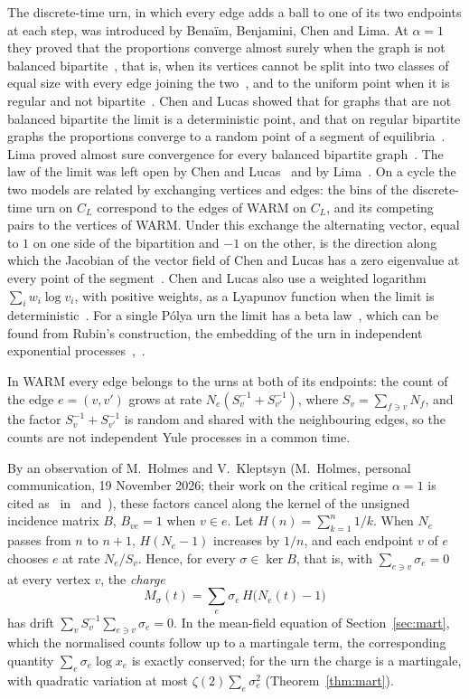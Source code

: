 \documentclass[11pt]{amsart}
\theoremstyle{remark}\newtheorem{remark}[theorem]{Remark}
\begin{document}
The discrete-time urn, in which every edge adds a ball to one of its two endpoints at each step, was introduced by
Bena\"im, Benjamini, Chen and Lima. At $\alpha=1$ they proved that the proportions converge almost surely when the
graph is not balanced bipartite~\cite[Corollary~1.3]{BBCL}, that is, when its vertices cannot be split into two
classes of equal size with every edge joining the two~\cite[Section~1]{BBCL}, and to the uniform point when it is regular and not
bipartite~\cite[Theorem~1.1]{BBCL}. Chen and Lucas showed that for graphs that are not balanced bipartite the limit is a
deterministic point, and that on regular bipartite graphs the proportions converge to a random point of a segment of
equilibria~\cite{CL}. Lima proved almost sure convergence for every balanced bipartite graph~\cite{Lima}. The law of
the limit was left open by Chen and Lucas~\cite{CL} and by Lima~\cite[Question~1]{Lima}. On a cycle the two models are
related by exchanging vertices and edges: the bins of the discrete-time urn on $C_L$ correspond to the edges of WARM on
$C_L$, and its competing pairs to the vertices of WARM. Under this exchange the alternating vector, equal to $1$ on one side of the bipartition and $-1$ on the other, is the
direction along which the Jacobian of the vector
field of Chen and Lucas has a zero eigenvalue at every point of the segment~\cite[Section~4]{CL}. Chen and Lucas also
use a weighted logarithm $\sum_iw_i\log v_i$, with positive weights, as a Lyapunov function when the limit is
deterministic~\cite[(3.2)]{CL}. For a single P\'olya urn the limit has a beta law~\cite[Theorem~2.1]{Pemantle}, which
can be found from Rubin's construction, the embedding of the urn in independent exponential
processes~\cite{Davis},~\cite[Section~2.3]{Pemantle}.

In WARM every edge belongs to the urns at both of its endpoints: the count of the edge $e=(v,v')$ grows at rate
$N_e(S_v^{-1}+S_{v'}^{-1})$, where $S_v=\sum_{f\ni v}N_f$, and the factor $S_v^{-1}+S_{v'}^{-1}$ is random and shared with
the neighbouring edges, so the counts are not independent Yule processes in a common time.

By an observation of M.~Holmes and V.~Kleptsyn (M.~Holmes, personal communication, 19 November 2026; their work on
the critical regime $\alpha=1$ is cited as~\cite{HKcrit} in~\cite{HHKtree} and~\cite{HHK3}), these factors cancel
along the kernel of the unsigned incidence matrix $B$, $B_{ve}=1$ when $v\in e$. Let $H(n)=\sum_{k=1}^n1/k$. When $N_e$
passes from $n$ to $n+1$, $H(N_e-1)$ increases by $1/n$, and each endpoint $v$ of $e$ chooses $e$ at rate $N_e/S_v$.
Hence, for every $\sigma\in\ker B$, that is, with $\sum_{e\ni v}\sigma_e=0$ at every vertex $v$, the \emph{charge}
\[ M_\sigma(t)=\sum_e\sigma_e\,H\bigl(N_e(t)-1\bigr) \]
has drift $\sum_vS_v^{-1}\sum_{e\ni v}\sigma_e=0$. In the mean-field equation of Section~\ref{sec:mart}, which the normalised
counts follow up to a martingale term, the corresponding quantity $\sum_e\sigma_e\log x_e$ is exactly conserved; for the urn the charge is a martingale, with quadratic variation at most
$\zeta(2)\sum_e\sigma_e^2$ (Theorem~\ref{thm:mart}).
\end{document}

